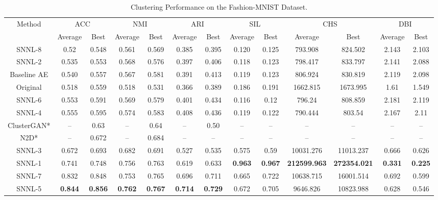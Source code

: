 \documentclass[conference]{IEEEtran}
\begin{document}
\begin{table*}[htb]
    \caption{Clustering Performance on the Fashion-MNIST Dataset.}
    \label{tab:fmnist_clustering_performance_latent_code}
    \centering
    \begin{tabular}{| *{13}{c|}}
        \hline
         \multirow{2}{*}{Method} & \multicolumn{2}{c|}{ACC} & \multicolumn{2}{c|}{NMI} & \multicolumn{2}{c|}{ARI} & \multicolumn{2}{c|}{SIL} & \multicolumn{2}{c|}{CHS} & \multicolumn{2}{c|}{DBI}\\
         \cline{2-13}
         & Average & Best & Average & Best & Average & Best & Average & Best & Average & Best & Average & Best \\ 
         \hline
         SNNL-8 & 0.52 & 0.548 & 0.561 & 0.569 & 0.385 & 0.395 & 0.120 & 0.125 & 793.908 & 824.502 & 2.143 & 2.103\\
        \hline
         SNNL-2 & 0.535 & 0.553 & 0.568 & 0.576 & 0.397 & 0.406 & 0.118 & 0.123 & 798.417 & 833.797 & 2.141 & 2.088\\
         \hline
         Baseline AE & 0.540 & 0.557 & 0.567 & 0.581 & 0.391 & 0.413 & 0.119 & 0.123 & 806.924 & 830.819 & 2.119 & 2.098\\
         \hline
         Original & 0.518 & 0.559 & 0.518 & 0.531 & 0.366 & 0.389 & 0.186 & 0.191 & 1662.815 & 1673.995 & 1.61 & 1.549\\
         \hline
         SNNL-6 & 0.553 & 0.591 & 0.569 & 0.579 & 0.401 & 0.434 & 0.116 & 0.12 & 796.24 & 808.859 & 2.181 & 2.119\\
         \hline
         SNNL-4 & 0.555 & 0.595 & 0.574 & 0.583 & 0.408 & 0.436 & 0.119 & 0.122 & 790.444 & 803.54 & 2.167 & 2.11\\
         \hline
         ClusterGAN\cite{mukherjee2019clustergan}* & -- & 0.63 & -- & 0.64 & -- & 0.50 & -- & -- & -- & -- & -- & --\\
         \hline
         N2D\cite{mcconville2019n2d}* & -- & 0.672 & -- & 0.684 & -- & -- & -- & -- & -- & -- & -- & --\\
         \hline
         SNNL-3 & 0.672 & 0.693 & 0.682 & 0.691 & 0.527 & 0.535 & 0.575 & 0.59 & 10031.276 & 11013.237 & 0.666 & 0.626\\
         \hline
         SNNL-1 & 0.741 & 0.748 & 0.756 & 0.763 & 0.619 & 0.633 & \textbf{0.963} & \textbf{0.967} & \textbf{212599.963} & \textbf{272354.021} & \textbf{0.331} & \textbf{0.225}\\
         \hline
         SNNL-7 & 0.832 & 0.848 & 0.753 & 0.765 & 0.696 & 0.711 & 0.665 & 0.722 & 10638.715 & 16001.514 & 0.692 & 0.599\\
         \hline
        SNNL-5 & \textbf{0.844} & \textbf{0.856} & \textbf{0.762} & \textbf{0.767} & \textbf{0.714} & \textbf{0.729} & 0.672 & 0.705 & 9646.826 & 10823.988 & 0.628 & 0.546\\
         \hline
    \end{tabular}
\end{table*}
\end{document}
